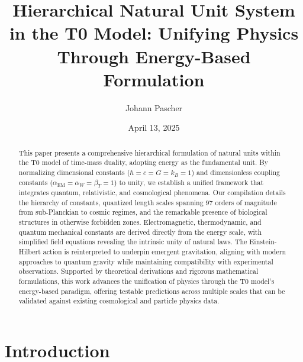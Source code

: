 \documentclass[twocolumn,aps,prl]{revtex4-2}
\begin{document}
	
	
	\title{Hierarchical Natural Unit System in the T0 Model: Unifying Physics Through Energy-Based Formulation}
	\author{Johann Pascher}
	\date{April 13, 2025}
	
	\begin{abstract}
		This paper presents a comprehensive hierarchical formulation of natural units within the T0 model of time-mass duality, adopting energy as the fundamental unit. By normalizing dimensional constants ($\hbar = c = G = k_B = 1$) and dimensionless coupling constants ($\alpha_{\text{EM}} = \alpha_W = \beta_T = 1$) to unity, we establish a unified framework that integrates quantum, relativistic, and cosmological phenomena. Our compilation details the hierarchy of constants, quantized length scales spanning 97 orders of magnitude from sub-Planckian to cosmic regimes, and the remarkable presence of biological structures in otherwise forbidden zones. Electromagnetic, thermodynamic, and quantum mechanical constants are derived directly from the energy scale, with simplified field equations revealing the intrinsic unity of natural laws. The Einstein-Hilbert action is reinterpreted to underpin emergent gravitation, aligning with modern approaches to quantum gravity while maintaining compatibility with experimental observations. Supported by theoretical derivations and rigorous mathematical formulations, this work advances the unification of physics through the T0 model's energy-based paradigm, offering testable predictions across multiple scales that can be validated against existing cosmological and particle physics data.
	\end{abstract}
	
	\maketitle
	
	\section{Introduction}
	\label{sec:introduction}
	
\end{document}
